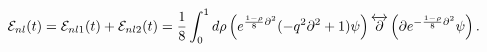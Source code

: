 \begin{equation}
\label{Enla} {\cal E}_{nl}(t)={\cal E}_{nl1}(t)+{\cal E}_{nl2}(t)=
\frac18\int_0^1 d\rho\left( e^{\frac{1-\rho}{8}{\partial}^2}(-q^2
{\partial}^2+1 ) \psi \right) \overleftrightarrow{\partial}
  \left(\partial  e^{-\frac{1-\rho}{8}{\partial}^2} \psi \right).
\end{equation}

